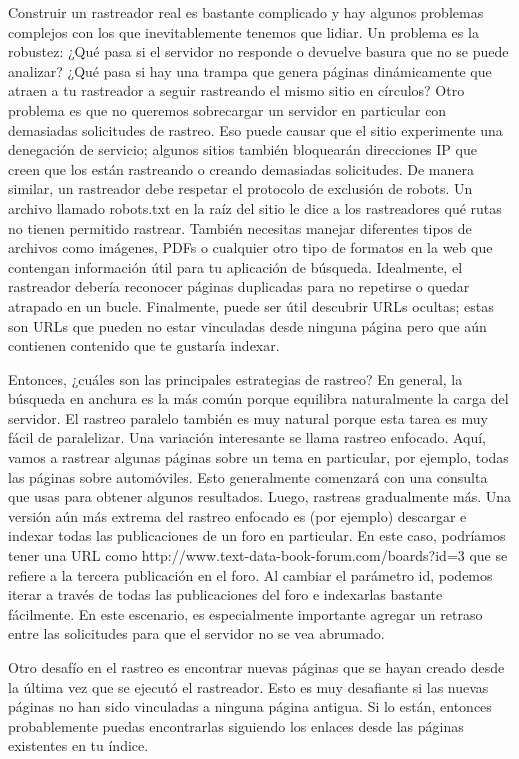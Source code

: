 Construir un rastreador real es bastante complicado y hay algunos problemas complejos con los que inevitablemente tenemos que lidiar. Un problema es la robustez: ¿Qué pasa si el servidor no responde o devuelve basura que no se puede analizar? ¿Qué pasa si hay una trampa que genera páginas dinámicamente que atraen a tu rastreador a seguir rastreando el mismo sitio en círculos? Otro problema es que no queremos sobrecargar un servidor en particular con demasiadas solicitudes de rastreo. Eso puede causar que el sitio experimente una denegación de servicio; algunos sitios también bloquearán direcciones IP que creen que los están rastreando o creando demasiadas solicitudes. De manera similar, un rastreador debe respetar el protocolo de exclusión de robots. Un archivo llamado robots.txt en la raíz del sitio le dice a los rastreadores qué rutas no tienen permitido rastrear. También necesitas manejar diferentes tipos de archivos como imágenes, PDFs o cualquier otro tipo de formatos en la web que contengan información útil para tu aplicación de búsqueda. Idealmente, el rastreador debería reconocer páginas duplicadas para no repetirse o quedar atrapado en un bucle. Finalmente, puede ser útil descubrir URLs ocultas; estas son URLs que pueden no estar vinculadas desde ninguna página pero que aún contienen contenido que te gustaría indexar.

Entonces, ¿cuáles son las principales estrategias de rastreo? En general, la búsqueda en anchura es la más común porque equilibra naturalmente la carga del servidor. El rastreo paralelo también es muy natural porque esta tarea es muy fácil de paralelizar. Una variación interesante se llama rastreo enfocado. Aquí, vamos a rastrear algunas páginas sobre un tema en particular, por ejemplo, todas las páginas sobre automóviles. Esto generalmente comenzará con una consulta que usas para obtener algunos resultados. Luego, rastreas gradualmente más. Una versión aún más extrema del rastreo enfocado es (por ejemplo) descargar e indexar todas las publicaciones de un foro en particular. En este caso, podríamos tener una URL como http://www.text-data-book-forum.com/boards?id=3 que se refiere a la tercera publicación en el foro. Al cambiar el parámetro id, podemos iterar a través de todas las publicaciones del foro e indexarlas bastante fácilmente. En este escenario, es especialmente importante agregar un retraso entre las solicitudes para que el servidor no se vea abrumado.

Otro desafío en el rastreo es encontrar nuevas páginas que se hayan creado desde la última vez que se ejecutó el rastreador. Esto es muy desafiante si las nuevas páginas no han sido vinculadas a ninguna página antigua. Si lo están, entonces probablemente puedas encontrarlas siguiendo los enlaces desde las páginas existentes en tu índice.

